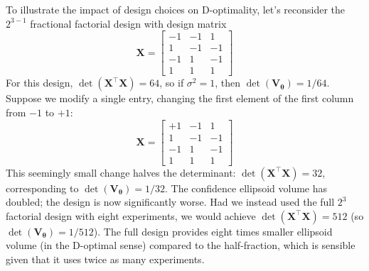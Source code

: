 To illustrate the impact of design choices on D-optimality, let's reconsider the $2^{3-1}$ fractional factorial design with design matrix
\begin{equation}
    \mathbf{X} = \begin{bmatrix} -1 & -1 & 1 \\ 1 & -1 & -1 \\ -1 & 1 & -1 \\ 1 & 1 & 1 \end{bmatrix}
\end{equation}
For this design, $\det(\mathbf{X}^\top \mathbf{X}) = 64$, so if $\sigma^2 = 1$, then $\det(\mathbf{V}_{\boldsymbol{\theta}}) = 1/64$. Suppose we modify a single entry, changing the first element of the first column from $-1$ to $+1$:
\begin{equation}
    \mathbf{X} = \begin{bmatrix} +1 & -1 & 1 \\ 1 & -1 & -1 \\ -1 & 1 & -1 \\ 1 & 1 & 1 \end{bmatrix}
\end{equation}
This seemingly small change halves the determinant: $\det(\mathbf{X}^\top \mathbf{X}) = 32$, corresponding to $\det(\mathbf{V}_{\boldsymbol{\theta}}) = 1/32$. The confidence ellipsoid volume has doubled; the design is now significantly worse. Had we instead used the full $2^3$ factorial design with eight experiments, we would achieve $\det(\mathbf{X}^\top \mathbf{X}) = 512$ (so $\det(\mathbf{V}_{\boldsymbol{\theta}}) = 1/512$). The full design provides eight times smaller ellipsoid volume (in the D-optimal sense) compared to the half-fraction, which is sensible given that it uses twice as many experiments.

